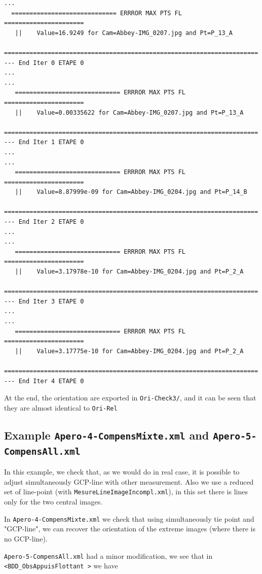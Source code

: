 \begin{verbatim}
...
  ============================= ERRROR MAX PTS FL ======================
   ||    Value=16.9249 for Cam=Abbey-IMG_0207.jpg and Pt=P_13_A
   ======================================================================
--- End Iter 0 ETAPE 0
...
...
   ============================= ERRROR MAX PTS FL ======================
   ||    Value=0.00335622 for Cam=Abbey-IMG_0207.jpg and Pt=P_13_A
   ======================================================================
--- End Iter 1 ETAPE 0
...
...
   ============================= ERRROR MAX PTS FL ======================
   ||    Value=8.87999e-09 for Cam=Abbey-IMG_0204.jpg and Pt=P_14_B
   ======================================================================
--- End Iter 2 ETAPE 0
...
...
   ============================= ERRROR MAX PTS FL ======================
   ||    Value=3.17978e-10 for Cam=Abbey-IMG_0204.jpg and Pt=P_2_A
   ======================================================================
--- End Iter 3 ETAPE 0
...
...
   ============================= ERRROR MAX PTS FL ======================
   ||    Value=3.17775e-10 for Cam=Abbey-IMG_0204.jpg and Pt=P_2_A
   ======================================================================
--- End Iter 4 ETAPE 0

\end{verbatim}

At the end, the orientation are exported in {\tt Ori-Check3/}, and it can be seen that they are almost identical to {\tt Ori-Rel}



\subsection{Example {\tt Apero-4-CompensMixte.xml} and  {\tt  Apero-5-CompensAll.xml}}

In this example, we check that, as we would do in real case, it is possible to adjust simultaneously GCP-line with
other measurement. Also we use a reduced set of line-point (with {\tt MesureLineImageIncompl.xml}), in this set
there is lines only for the two central images.

In {\tt Apero-4-CompensMixte.xml} we check that using simultaneously tie point and "GCP-line", we can recover the orientation
of the extreme images (where there is no GCP-line).

{\tt  Apero-5-CompensAll.xml} had a minor modification, we see that in {\tt <BDD\_ObsAppuisFlottant >} we have

